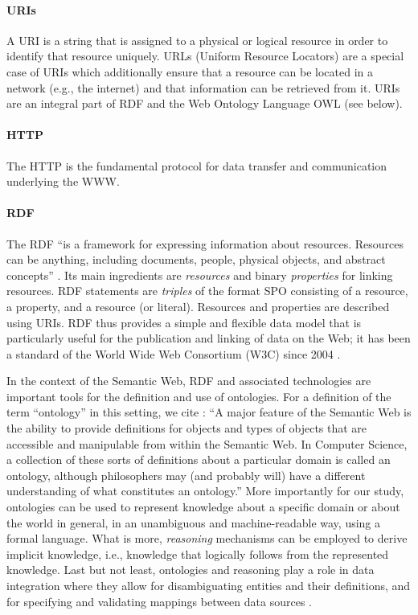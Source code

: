 \paragraph{URIs}
A \gls{URI} is a string that is assigned to a physical or logical resource
in order to identify that resource uniquely. URLs (Uniform Resource Locators)
are a special case of URIs which additionally ensure that a resource
can be located in a network (e.g., the internet) and that information can be retrieved from it.
URIs are an integral part of RDF and the Web Ontology Language OWL (see below).

\paragraph{HTTP}
The \gls{HTTP} is the fundamental protocol for data transfer and communication underlying the \gls{WWW}.

\paragraph{RDF}
The \gls{RDF} \enquote{is a framework for expressing information about resources. Resources can be anything, including documents, people, physical objects, and abstract concepts}
\autocite{RDFPrimer}.
Its main ingredients are \emph{resources} and binary \emph{properties} for linking resources.
RDF statements are \emph{triples} of the format \gls{SPO}
consisting of a resource, a property, and a resource (or literal).
Resources and properties are described using \glspl{URI}.
RDF thus provides a simple and flexible data model that is particularly useful for the publication
and linking of data on the Web;
it has been a standard of the
World Wide Web Consortium (W3C) since 2004 \autocite{W3CRDF}.

\par\medskip
In the context of the Semantic Web, \gls{RDF} and associated technologies
are important tools for the definition and use of ontologies.
For a definition of the term \enquote{ontology} in this setting, we cite \textcite{Horrocks2011}:
\enquote{A major feature of the Semantic Web is the ability to provide definitions for objects and types of objects that are accessible and manipulable from within the Semantic Web. In Computer Science, a collection of these sorts of definitions about a particular domain is called an ontology, although philosophers may (and probably will) have a different understanding of what constitutes an ontology.}
More importantly for our study, ontologies can be used to represent knowledge about a specific domain
or about the world in general, in an unambiguous and machine-readable way, using a formal language.
What is more, \emph{reasoning} mechanisms can be employed to derive implicit knowledge,
i.e., knowledge that logically follows from the represented knowledge.
Last but not least, ontologies and reasoning play a role in data integration
where they allow for disambiguating entities and their definitions,
and for specifying and validating mappings between data sources
\autocites[cf.][]{Wache2001}[§12]{Doan2012}.

